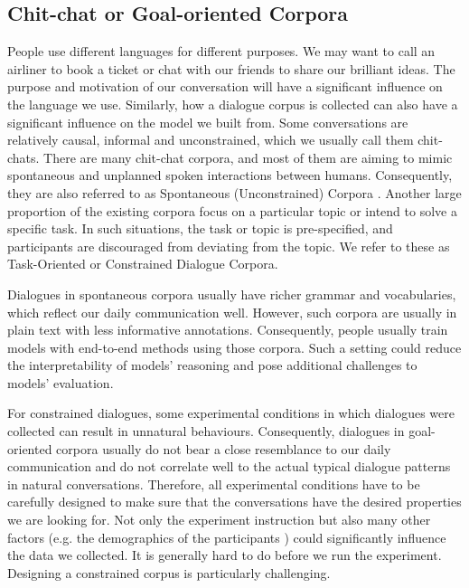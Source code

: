 \documentclass[bsc,frontabs,twoside,singlespacing,parskip,deptreport]{infthesis}     %
\begin{document}
\subsection{Chit-chat or Goal-oriented Corpora}

People use different languages for different purposes. We may want to call an airliner to book a ticket or chat with our friends to share our brilliant ideas. The purpose and motivation of our conversation will have a significant influence on the language we use. Similarly, how a dialogue corpus is collected can also have a significant influence on the model we built from. Some conversations are relatively causal, informal and unconstrained, which we usually call them chit-chats. There are many chit-chat corpora, and most of them are aiming to mimic spontaneous and unplanned spoken interactions between humans. Consequently, they are also referred to as Spontaneous (Unconstrained) Corpora \cite{serban2018survey}. Another large proportion of the existing corpora focus on a particular topic or intend to solve a specific task. In such situations, the task or topic is pre-specified, and participants are discouraged from deviating from the topic. We refer to these as Task-Oriented or Constrained Dialogue Corpora.

Dialogues in spontaneous corpora usually have richer grammar and vocabularies, which reflect our daily communication well. However, such corpora are usually in plain text with less informative annotations. Consequently, people usually train models with end-to-end methods using those corpora. Such a setting could reduce the interpretability of models' reasoning and pose additional challenges to models' evaluation.

For constrained dialogues, some experimental conditions in which dialogues were collected can result in unnatural behaviours. Consequently, dialogues in goal-oriented corpora usually do not bear a close resemblance to our daily communication and do not correlate well to the actual typical dialogue patterns in natural conversations. Therefore, all experimental conditions have to be carefully designed to make sure that the conversations have the desired properties we are looking for. Not only the experiment instruction but also many other factors (e.g. the demographics of the participants \cite{ai2007comparing,young2013pomdp}) could significantly influence the data we collected. It is generally hard to do before we run the experiment. Designing a constrained corpus is particularly challenging.
\end{document}
